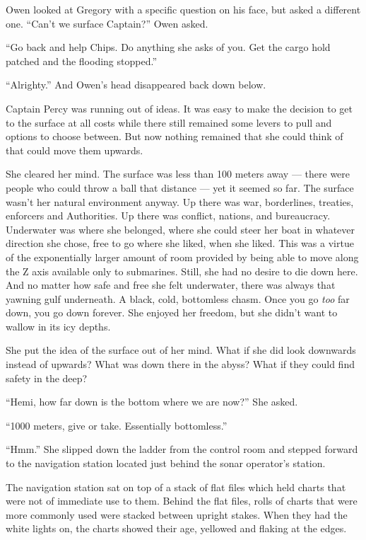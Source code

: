 \documentclass[
]{scrbook}
\begin{document}
Owen looked at Gregory with a specific question on his face, but asked a
different one. ``Can't we surface Captain?'' Owen asked.

``Go back and help Chips. Do anything she asks of you. Get the cargo
hold patched and the flooding stopped.''

``Alrighty.'' And Owen's head disappeared back down below.

Captain Percy was running out of ideas. It was easy to make the decision
to get to the surface at all costs while there still remained some
levers to pull and options to choose between. But now nothing remained
that she could think of that could move them upwards.

She cleared her mind. The surface was less than 100 meters away ---
there were people who could throw a ball that distance --- yet it seemed
so far. The surface wasn't her natural environment anyway. Up there was
war, borderlines, treaties, enforcers and Authorities. Up there was
conflict, nations, and bureaucracy. Underwater was where she belonged,
where she could steer her boat in whatever direction she chose, free to
go where she liked, when she liked. This was a virtue of the
exponentially larger amount of room provided by being able to move along
the Z axis available only to submarines. Still, she had no desire to die
down here. And no matter how safe and free she felt underwater, there
was always that yawning gulf underneath. A black, cold, bottomless
chasm. Once you go \emph{too} far down, you go down forever. She enjoyed
her freedom, but she didn't want to wallow in its icy depths.

She put the idea of the surface out of her mind. What if she did look
downwards instead of upwards? What was down there in the abyss? What if
they could find safety in the deep?

``Hemi, how far down is the bottom where we are now?'' She asked.

``1000 meters, give or take. Essentially bottomless.''

``Hmm.'' She slipped down the ladder from the control room and stepped
forward to the navigation station located just behind the sonar
operator's station.

The navigation station sat on top of a stack of flat files which held
charts that were not of immediate use to them. Behind the flat files,
rolls of charts that were more commonly used were stacked between
upright stakes. When they had the white lights on, the charts showed
their age, yellowed and flaking at the edges.
\end{document}
